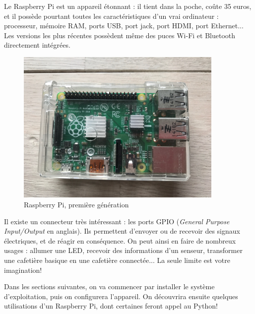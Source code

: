 Le Raspberry Pi est un appareil étonnant : il tient dans la poche, coûte 35 euros, et il possède pourtant toutes les caractéristiques d'un vrai ordinateur : processeur, mémoire RAM, ports USB, port jack, port HDMI, port Ethernet... Les versions les plus récentes possèdent même des puces Wi-Fi et Bluetooth directement intégrées.

\begin{figure}[h!]
\begin{center}
\includegraphics[width=10cm]{img/raspberry.JPG}
\end{center}
\caption{Raspberry Pi, première génération}
\label{raspberry}
\end{figure}

Il existe un connecteur très intéressant : les ports GPIO (\textit{General Purpose Input/Output} en anglais). Ils permettent d'envoyer ou de recevoir des signaux électriques, et de réagir en conséquence. On peut ainsi en faire de nombreux usages : allumer une LED, recevoir des informations d'un senseur, transformer une cafetière basique en une cafetière connectée... La seule limite est votre imagination!

Dans les sections suivantes, on va commencer par installer le système d'exploitation, puis on configurera l'appareil. On découvrira ensuite quelques utilisations d'un Raspberry Pi, dont certaines feront appel au Python!
